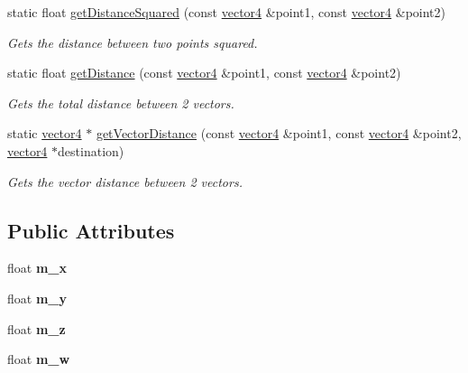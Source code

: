\begin{DoxyCompactItemize}
static float \hyperlink{classflounder_1_1vector4_a09dce41520478186f5afd2bef8290776}{get\+Distance\+Squared} (const \hyperlink{classflounder_1_1vector4}{vector4} \&point1, const \hyperlink{classflounder_1_1vector4}{vector4} \&point2)
\begin{DoxyCompactList}\small\item\em Gets the distance between two points squared. \end{DoxyCompactList}\item 
static float \hyperlink{classflounder_1_1vector4_a24128e65e05cc5430c905349b859dfc1}{get\+Distance} (const \hyperlink{classflounder_1_1vector4}{vector4} \&point1, const \hyperlink{classflounder_1_1vector4}{vector4} \&point2)
\begin{DoxyCompactList}\small\item\em Gets the total distance between 2 vectors. \end{DoxyCompactList}\item 
static \hyperlink{classflounder_1_1vector4}{vector4} $\ast$ \hyperlink{classflounder_1_1vector4_a211be3c7da1bdc5a2b71661b291e140d}{get\+Vector\+Distance} (const \hyperlink{classflounder_1_1vector4}{vector4} \&point1, const \hyperlink{classflounder_1_1vector4}{vector4} \&point2, \hyperlink{classflounder_1_1vector4}{vector4} $\ast$destination)
\begin{DoxyCompactList}\small\item\em Gets the vector distance between 2 vectors. \end{DoxyCompactList}\end{DoxyCompactItemize}
\subsection*{Public Attributes}
\begin{DoxyCompactItemize}
\item 
\mbox{\label{classflounder_1_1vector4_a6aad1a0bbbdb2a338a621b7a86446b42}} 
float {\bfseries m\+\_\+x}
\item 
\mbox{\label{classflounder_1_1vector4_a89806f130cc77171ea29ccd0bdc65685}} 
float {\bfseries m\+\_\+y}
\item 
\mbox{\label{classflounder_1_1vector4_a101ae9937f3a9bfdc3b7dca5e90d39bc}} 
float {\bfseries m\+\_\+z}
\item 
\mbox{\label{classflounder_1_1vector4_a0f94de958c3ae8097e009d0526345b5b}} 
float {\bfseries m\+\_\+w}
\end{DoxyCompactItemize}


